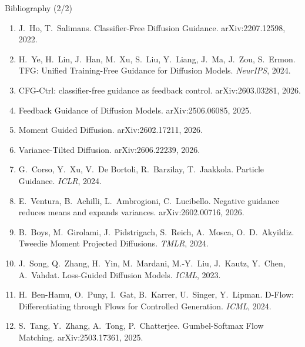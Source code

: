 \documentclass[aspectratio=169,10pt]{beamer}
\begin{document}
\begin{frame}{Bibliography (2/2)}
  {\scriptsize
  \begin{enumerate}\setlength\itemsep{0.05em}\setcounter{enumi}{13}
    \item J.\ Ho, T.\ Salimans. Classifier-Free Diffusion Guidance. arXiv:2207.12598, 2022.
    \item H.\ Ye, H.\ Lin, J.\ Han, M.\ Xu, S.\ Liu, Y.\ Liang, J.\ Ma, J.\ Zou, S.\ Ermon. TFG: Unified Training-Free Guidance for Diffusion Models. \emph{NeurIPS}, 2024.
    \item CFG-Ctrl: classifier-free guidance as feedback control. arXiv:2603.03281, 2026.
    \item Feedback Guidance of Diffusion Models. arXiv:2506.06085, 2025.
    \item Moment Guided Diffusion. arXiv:2602.17211, 2026.
    \item Variance-Tilted Diffusion. arXiv:2606.22239, 2026.
    \item G.\ Corso, Y.\ Xu, V.\ De Bortoli, R.\ Barzilay, T.\ Jaakkola. Particle Guidance. \emph{ICLR}, 2024.
    \item E.\ Ventura, B.\ Achilli, L.\ Ambrogioni, C.\ Lucibello. Negative guidance reduces means and expands variances. arXiv:2602.00716, 2026.
    \item B.\ Boys, M.\ Girolami, J.\ Pidstrigach, S.\ Reich, A.\ Mosca, O.\ D.\ Akyildiz. Tweedie Moment Projected Diffusions. \emph{TMLR}, 2024.
    \item J.\ Song, Q.\ Zhang, H.\ Yin, M.\ Mardani, M.-Y.\ Liu, J.\ Kautz, Y.\ Chen, A.\ Vahdat. Loss-Guided Diffusion Models. \emph{ICML}, 2023.
    \item H.\ Ben-Hamu, O.\ Puny, I.\ Gat, B.\ Karrer, U.\ Singer, Y.\ Lipman. D-Flow: Differentiating through Flows for Controlled Generation. \emph{ICML}, 2024.
    \item S.\ Tang, Y.\ Zhang, A.\ Tong, P.\ Chatterjee. Gumbel-Softmax Flow Matching. arXiv:2503.17361, 2025.
  \end{enumerate}}
\end{frame}
\end{document}
